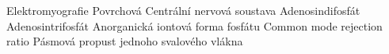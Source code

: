            {Elektromyografie}
          {Povrchová }
           {Centrální nervová soustava}
           {Adenosindifosfát}
           {Adenosintrifosfát}
  {Anorganická iontová forma fosfátu}
          {Common mode rejection ratio}
            {Pásmová propust}
         { jednoho svalového vlákna}
